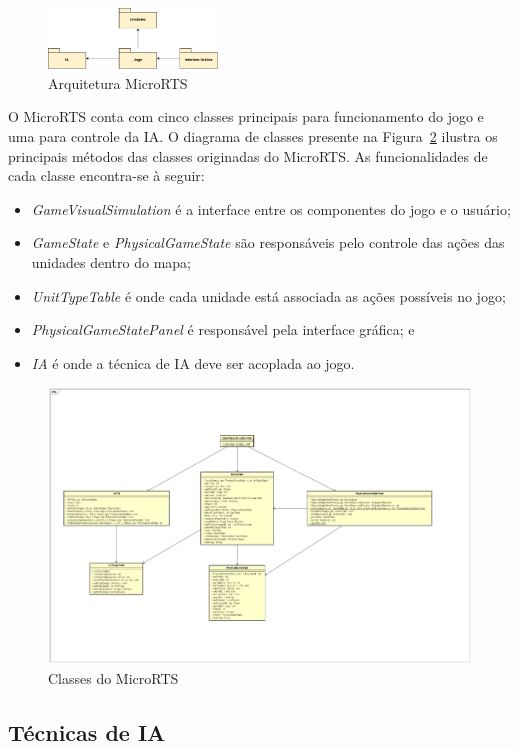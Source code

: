 \begin{figure}[ht]
	\centering
	\includegraphics[width=0.4\textwidth]{fig/pacotes.pdf}
	\caption{Arquitetura MicroRTS}
	\label{fig:pacotes}
\end{figure}

O MicroRTS conta com cinco classes principais para funcionamento do jogo e uma para controle da IA. O diagrama de classes presente na Figura~\ref{fig:classes} ilustra os principais métodos das classes originadas do MicroRTS. As funcionalidades de cada classe encontra-se à seguir: 

\begin{itemize}
	\item \textit{GameVisualSimulation} é a interface entre os componentes do jogo e o usuário;
	\item \textit{GameState} e \textit{PhysicalGameState} são responsáveis pelo controle das ações das unidades dentro do mapa;
	\item \textit{UnitTypeTable} é onde cada unidade está associada as ações possíveis no jogo;
	\item \textit{PhysicalGameStatePanel} é responsável pela interface gráfica; e
	\item \textit{IA} é onde a técnica de IA deve ser acoplada ao jogo.
\end{itemize}

\begin{figure}[ht]
	\centering
	\includegraphics[width=1\textwidth]{fig/classes.pdf}
	\caption{Classes do MicroRTS}
	\label{fig:classes}
\end{figure} 

\subsection{Técnicas de IA}
